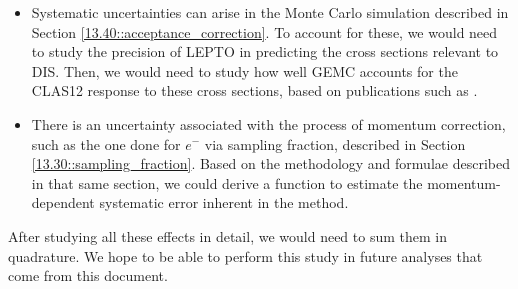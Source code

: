 \begin{itemize}
        \item
            Systematic uncertainties can arise in the Monte Carlo simulation described in Section \ref{13.40::acceptance_correction}.
            To account for these, we would need to study the precision of LEPTO in predicting the cross sections relevant to DIS.
            Then, we would need to study how well GEMC accounts for the CLAS12 response to these cross sections, based on publications such as \cite{ungaro2020gemc}.

        \item
            There is an uncertainty associated with the process of momentum correction, such as the one done for $e^-$ via sampling fraction, described in Section \ref{13.30::sampling_fraction}.
            Based on the methodology and formulae described in that same section, we could derive a function to estimate the momentum-dependent systematic error inherent in the method.
    \end{itemize}

    After studying all these effects in detail, we would need to sum them in quadrature.
    We hope to be able to perform this study in future analyses that come from this document.

    \pagebreak
